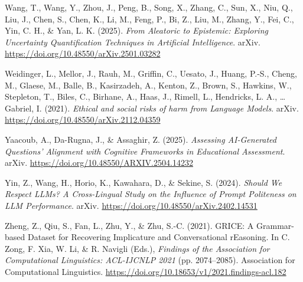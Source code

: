 \documentclass[
  12pt,
]{article}
\newlength{\cslhangindent}
\newenvironment{CSLReferences}[2] %
 {\begin{list}{}{%
  \setlength{\itemindent}{0pt}
  \setlength{\leftmargin}{0pt}
  \setlength{\parsep}{0pt}
  \ifodd #1
   \setlength{\leftmargin}{\cslhangindent}
   \setlength{\itemindent}{-1\cslhangindent}
  \fi
  \setlength{\itemsep}{#2\baselineskip}}}
 {\end{list}}
\begin{document}
\begin{CSLReferences}{1}{0}
Wang, T., Wang, Y., Zhou, J., Peng, B., Song, X., Zhang, C., Sun, X., Niu, Q., Liu, J., Chen, S., Chen, K., Li, M., Feng, P., Bi, Z., Liu, M., Zhang, Y., Fei, C., Yin, C. H., \& Yan, L. K. (2025). \emph{From {Aleatoric} to {Epistemic}: {Exploring} {Uncertainty} {Quantification} {Techniques} in {Artificial} {Intelligence}}. arXiv. \url{https://doi.org/10.48550/arXiv.2501.03282}

Weidinger, L., Mellor, J., Rauh, M., Griffin, C., Uesato, J., Huang, P.-S., Cheng, M., Glaese, M., Balle, B., Kasirzadeh, A., Kenton, Z., Brown, S., Hawkins, W., Stepleton, T., Biles, C., Birhane, A., Haas, J., Rimell, L., Hendricks, L. A., \ldots{} Gabriel, I. (2021). \emph{Ethical and social risks of harm from {Language} {Models}}. arXiv. \url{https://doi.org/10.48550/arXiv.2112.04359}

Yaacoub, A., Da-Rugna, J., \& Assaghir, Z. (2025). \emph{Assessing {AI}-{Generated} {Questions}' {Alignment} with {Cognitive} {Frameworks} in {Educational} {Assessment}}. arXiv. \url{https://doi.org/10.48550/ARXIV.2504.14232}

Yin, Z., Wang, H., Horio, K., Kawahara, D., \& Sekine, S. (2024). \emph{Should {We} {Respect} {LLMs}? {A} {Cross}-{Lingual} {Study} on the {Influence} of {Prompt} {Politeness} on {LLM} {Performance}}. arXiv. \url{https://doi.org/10.48550/arXiv.2402.14531}

Zheng, Z., Qiu, S., Fan, L., Zhu, Y., \& Zhu, S.-C. (2021). {GRICE}: {A} {Grammar}-based {Dataset} for {Recovering} {Implicature} and {Conversational} {rEasoning}. In C. Zong, F. Xia, W. Li, \& R. Navigli (Eds.), \emph{Findings of the {Association} for {Computational} {Linguistics}: {ACL}-{IJCNLP} 2021} (pp. 2074--2085). Association for Computational Linguistics. \url{https://doi.org/10.18653/v1/2021.findings-acl.182}

\end{CSLReferences}
\end{document}
